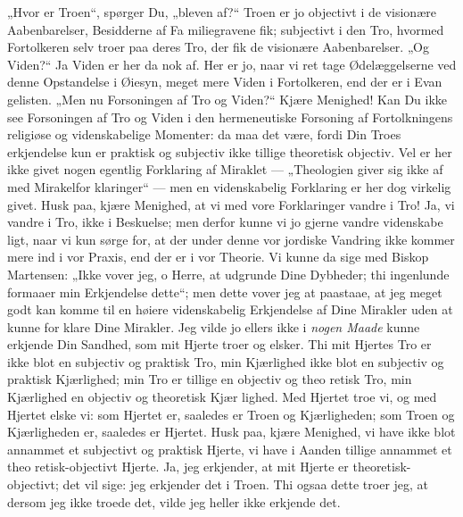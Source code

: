 \documentclass[12pt]{book}
\newcommand{\opage}[1]{\marginnote{\footnotesize\textit{[#1]}}}
\begin{document}
„Hvor er Troen“, spørger Du, „bleven af?“ Troen er
\opage{51}\setcounter{footnote}{0}%
jo objectivt i de visionære Aabenbarelser, Besidderne af Fa\-%
miliegravene fik; subjectivt i den Tro, hvormed Fortolkeren
selv troer paa deres Tro, der fik de visionære Aabenbarelser.
„Og Viden?“ Ja Viden er her da nok af. Her er jo,
naar vi ret tage Ødelæggelserne ved denne Opstandelse i
Øiesyn, meget mere Viden i Fortolkeren, end der er i Evan\-%
gelisten. „Men nu Forsoningen af Tro og Viden?“ Kjære
Menighed! Kan Du ikke see Forsoningen af Tro og Viden
i den hermeneutiske Forsoning af Fortolkningens religiøse og
videnskabelige Momenter: da maa det være, fordi Din Troes\-%
erkjendelse kun er praktisk og subjectiv ikke tillige theoretisk
objectiv. Vel er her ikke givet nogen egentlig Forklaring af
Miraklet --- „Theologien giver sig ikke af med Mirakelfor\-%
klaringer“ --- men en videnskabelig Forklaring er her dog
virkelig givet. Husk paa, kjære Menighed, at vi med vore
Forklaringer vandre i Tro! Ja, vi vandre i Tro, ikke i
Beskuelse; men derfor kunne vi jo gjerne vandre videnskabe\-%
ligt, naar vi kun sørge for, at der under denne vor jordiske
Vandring ikke kommer mere ind i vor Praxis, end der er i
vor Theorie. Vi kunne da sige med Biskop Martensen:
„Ikke vover jeg, o Herre, at udgrunde Dine Dybheder; thi
ingenlunde formaaer min Erkjendelse dette“; men dette vover
jeg at paastaae, at jeg meget godt kan komme til en høiere
videnskabelig Erkjendelse af Dine Mirakler uden at kunne for\-%
klare Dine Mirakler. Jeg vilde jo ellers ikke i \emph{nogen
Maade} kunne erkjende Din Sandhed, som mit Hjerte troer
og elsker. Thi mit Hjertes Tro er ikke blot en subjectiv
og praktisk Tro, min Kjærlighed ikke blot en subjectiv og
praktisk Kjærlighed; min Tro er tillige en objectiv og theo\-%
retisk Tro, min Kjærlighed en objectiv og theoretisk Kjær\-%
lighed. Med Hjertet troe vi, og med Hjertet elske vi:
som Hjertet er, saaledes er Troen og Kjærligheden; som
Troen og Kjærligheden er, saaledes er Hjertet. Husk paa,
kjære Menighed, vi have ikke blot annammet et subjectivt og
\opage{52}\setcounter{footnote}{0}%
praktisk Hjerte, vi have i Aanden tillige annammet et theo\-%
retisk-objectivt Hjerte. Ja, jeg erkjender, at mit Hjerte er
theoretisk-objectivt; det vil sige: jeg erkjender det i Troen.
Thi ogsaa dette troer jeg, at dersom jeg ikke troede det,
vilde jeg heller ikke erkjende det.
\end{document}
